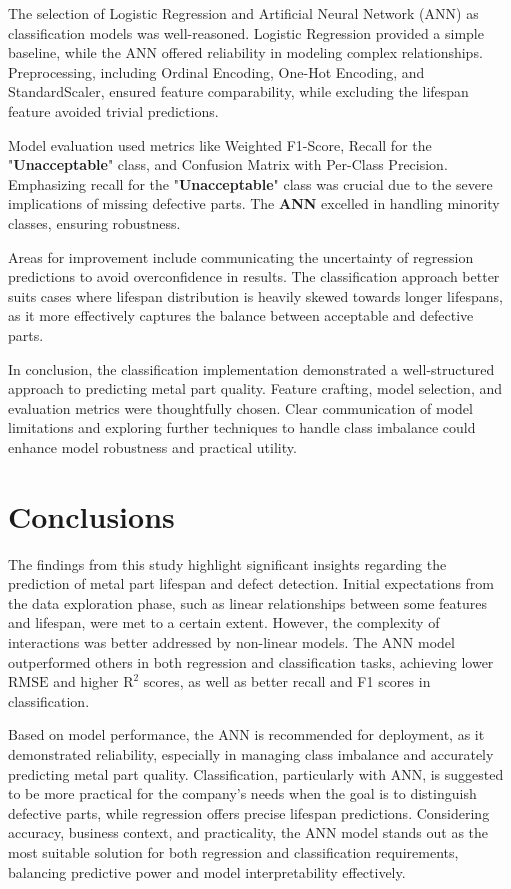 \documentclass{article}
\begin{document}
The selection of Logistic Regression and Artificial Neural Network (ANN) as classification models was well-reasoned. Logistic Regression provided a simple baseline, while the ANN offered reliability in modeling complex relationships. Preprocessing, including Ordinal Encoding, One-Hot Encoding, and StandardScaler, ensured feature comparability, while excluding the lifespan feature avoided trivial predictions.

Model evaluation used metrics like Weighted F1-Score, Recall for the "\textbf{Unacceptable}" class, and Confusion Matrix with Per-Class Precision. Emphasizing recall for the "\textbf{Unacceptable}" class was crucial due to the severe implications of missing defective parts. The \textbf{ANN} excelled in handling minority classes, ensuring robustness.

Areas for improvement include communicating the uncertainty of regression predictions to avoid overconfidence in results. The classification approach better suits cases where lifespan distribution is heavily skewed towards longer lifespans, as it more effectively captures the balance between acceptable and defective parts.

In conclusion, the classification implementation demonstrated a well-structured approach to predicting metal part quality. Feature crafting, model selection, and evaluation metrics were thoughtfully chosen. Clear communication of model limitations and exploring further techniques to handle class imbalance could enhance model robustness and practical utility.

\section{Conclusions}

The findings from this study highlight significant insights regarding the prediction of metal part lifespan and defect detection. Initial expectations from the data exploration phase, such as linear relationships between some features and lifespan, were met to a certain extent. However, the complexity of interactions was better addressed by non-linear models. The ANN model outperformed others in both regression and classification tasks, achieving lower $\text{RMSE}$ and higher $\text{R}^2$ scores, as well as better recall and F1 scores in classification.

Based on model performance, the ANN is recommended for deployment, as it demonstrated reliability, especially in managing class imbalance and accurately predicting metal part quality. Classification, particularly with ANN, is suggested to be more practical for the company's needs when the goal is to distinguish defective parts, while regression offers precise lifespan predictions. Considering accuracy, business context, and practicality, the ANN model stands out as the most suitable solution for both regression and classification requirements, balancing predictive power and model interpretability effectively.

\printbibliography
\end{document}
